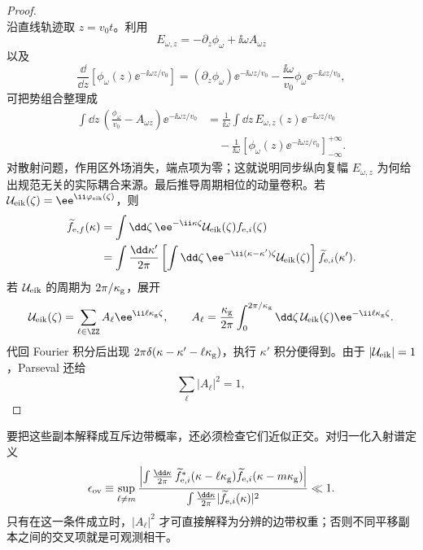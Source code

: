 \begin{proof}
\begin{equation*}
\end{equation*}
沿直线轨迹取 $z=v_0t$。利用
\begin{equation*}
E_{\omega,z}=-\partial_z\phi_\omega+\ii\omega A_{\omega z}
\end{equation*}
以及
\begin{equation*}
\frac{\dd}{\dd z}
\left[\phi_\omega(z)\ee^{-\ii\omega z/v_0}\right]
=(\partial_z\phi_\omega)\ee^{-\ii\omega z/v_0}
-\frac{\ii\omega}{v_0}\phi_\omega\ee^{-\ii\omega z/v_0},
\end{equation*}
可把势组合整理成
\begin{align*}
\int\dd z\,
\left(\frac{\phi_\omega}{v_0}-A_{\omega z}\right)
\ee^{-\ii\omega z/v_0}
&=\frac{1}{\ii\omega}
\int\dd z\,E_{\omega,z}(z)
\ee^{-\ii\omega z/v_0}\\
&\quad
-\frac{1}{\ii\omega}
\left[\phi_\omega(z)\ee^{-\ii\omega z/v_0}\right]_{-\infty}^{+\infty}.
\end{align*}
对散射问题，作用区外场消失，端点项为零；这就说明同步纵向复幅 $E_{\omega,z}$ 为何给出规范无关的实际耦合来源。最后推导周期相位的动量卷积。若 $\mathcal U_{\rm eik}(\zeta)=\ee^{\ii\varphi_{\rm eik}(\zeta)}$，则
\begin{align*}
\widetilde f_{\mathrm e,f}(\kappa)
&=\int\dd\zeta\,\ee^{-\ii \kappa\zeta}
\mathcal U_{\rm eik}(\zeta)f_{\mathrm e,i}(\zeta)\\
&=\int\frac{\dd \kappa'}{2\pi}
\left[\int\dd\zeta\,
 \ee^{-\ii(\kappa-\kappa')\zeta}\mathcal U_{\rm eik}(\zeta)\right]
\widetilde f_{\mathrm e,i}(\kappa').
\end{align*}
若 $\mathcal U_{\rm eik}$ 的周期为 $2\pi/\kappa_{\rm g}$，展开
\begin{equation*}
\mathcal U_{\rm eik}(\zeta)=\sum_{\ell\in\ZZ}A_\ell \ee^{\ii\ell\kappa_{\rm g}\zeta},
\qquad
A_\ell=\frac{\kappa_{\rm g}}{2\pi}
\int_0^{2\pi/\kappa_{\rm g}}\dd\zeta\,
\mathcal U_{\rm eik}(\zeta)\ee^{-\ii\ell\kappa_{\rm g}\zeta}.
\end{equation*}
代回 Fourier 积分后出现
$2\pi\delta(\kappa-\kappa'-\ell\kappa_{\rm g})$，执行 $\kappa'$ 积分便得到。由于 $|\mathcal U_{\rm eik}|=1$，Parseval 还给
\begin{equation*}
\sum_\ell|A_\ell|^2=1,
\end{equation*}
\end{proof}


要把这些副本解释成互斥边带概率，还必须检查它们近似正交。对归一化入射谱定义
\begin{equation}
{
\epsilon_{\rm ov}
\equiv\sup_{\ell\neq m}
\frac{\left|\int\frac{\dd \kappa}{2\pi}\,
\widetilde f_{\mathrm e,i}^*(\kappa-\ell\kappa_{\rm g})\widetilde f_{\mathrm e,i}(\kappa-m\kappa_{\rm g})\right|}
{\int\frac{\dd \kappa}{2\pi}|\widetilde f_{\mathrm e,i}(\kappa)|^2}\ll1.}
\label{eq:translated_packet_overlap_condition}
\end{equation}
只有在这一条件成立时，$|A_\ell|^2$ 才可直接解释为分辨的边带权重；否则不同平移副本之间的交叉项就是可观测相干。

